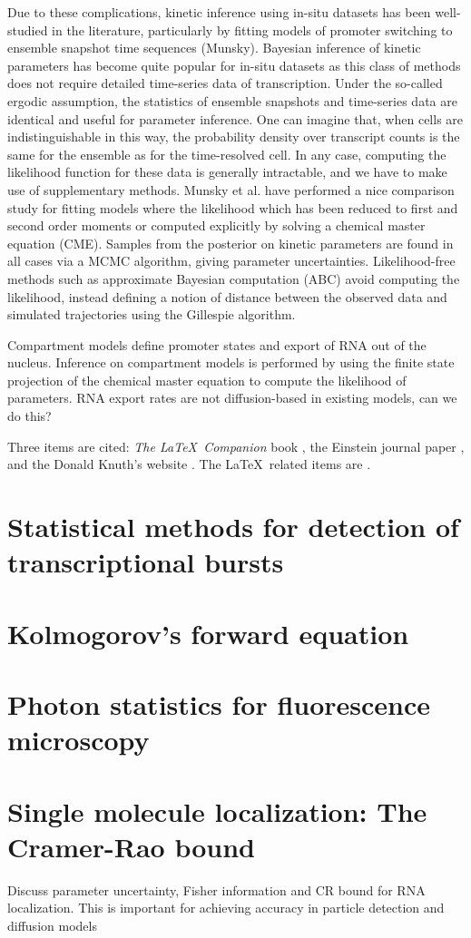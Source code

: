\documentclass{article}
\begin{document}
Due to these complications, kinetic inference using  in-situ datasets has been well-studied in the literature, particularly by fitting models of promoter switching to ensemble snapshot time sequences (Munsky). Bayesian inference of kinetic parameters has become quite popular for in-situ datasets as this class of methods does not require detailed time-series data of transcription. Under the so-called ergodic assumption, the statistics of ensemble snapshots and time-series data are identical and useful for parameter inference. One can imagine that, when cells are indistinguishable in this way, the probability density over transcript counts is the same for the ensemble as for the time-resolved cell. In any case, computing the likelihood function for these data is generally intractable, and we have to make use of supplementary methods. Munsky et al. have performed a nice comparison study for fitting models where the likelihood which has been reduced to first and second order moments or computed explicitly by solving a chemical master equation (CME). Samples from the posterior on kinetic parameters are found in all cases via a MCMC algorithm, giving parameter uncertainties. Likelihood-free methods such as approximate Bayesian computation (ABC) avoid computing the likelihood, instead defining a notion of distance between the observed data and simulated trajectories using the Gillespie algorithm.


Compartment models define promoter states and export of RNA out of the nucleus. Inference on compartment models is performed by using the finite state projection of the chemical master equation to compute the likelihood of parameters. RNA export rates are not diffusion-based in existing models, can we do this?  

Three items are cited: \textit{The \LaTeX\ Companion} book \cite{latexcompanion}, the Einstein journal paper \citet{einstein}, and the 
Donald Knuth's website \cite{knuthwebsite}. The \LaTeX\ related items are
\cite{latexcompanion,knuthwebsite}.  



\appendix
\section{Statistical methods for detection of transcriptional bursts}

\section{Kolmogorov's forward equation}

\section{Photon statistics for fluorescence microscopy}



\section{Single molecule localization: The Cramer-Rao bound}

Discuss parameter uncertainty, Fisher information and CR bound for RNA localization. This is important for achieving accuracy in particle detection and diffusion models
\end{document}
